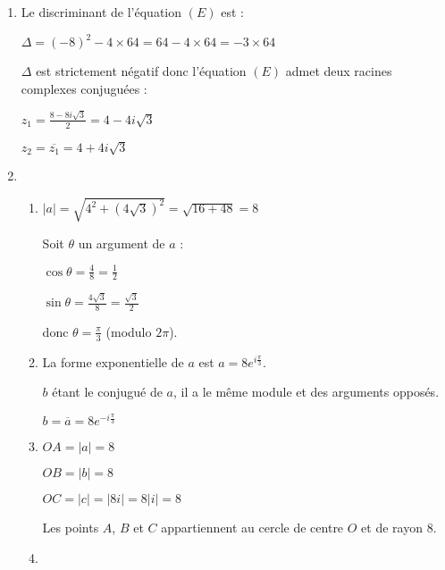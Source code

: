 \begin{corrige}
     \begin{enumerate}
          \item
          Le discriminant de l'équation $(E)$ est :
          \par
          $\Delta = (-8)^2-4 \times 64 = 64-4 \times 64=-3 \times 64$
          \par
          $\Delta$ est strictement négatif donc l'équation $(E)$ admet deux racines complexes conjuguées :
          \par
          $z_1=\frac{8-8i\sqrt{3}}{2}=4-4i\sqrt{3}$
          \par
          $z_2=\overline{z_1}=4+4i\sqrt{3}$
          \item
          \begin{enumerate}[label=\alph*.] 
               \item
               $|a|=\sqrt{4^2+(4\sqrt{3})^2}=\sqrt{16+48}=8$
               \par
               Soit $\theta$ un argument de $a$ :
               \par
               $\cos \theta=\frac{4}{8}=\frac{1}{2}$
               \par
               $\sin \theta=\frac{4\sqrt{3}}{8}=\frac{\sqrt{3}}{2}$
               \par
               donc $\theta = \frac{\pi}{3}$ (modulo $2\pi$).
               \item
               La forme exponentielle de $a$ est $a=8 e^{i \frac{\pi}{3}}$.
               \par
               $b$ étant le conjugué de $a$, il a le même module et des arguments opposés.
               \par
               $b=\overline{a}=8 e^{-i \frac{\pi}{3}}$
               \item
               $OA=|a|=8$
               \par
               $OB=|b|=8$
               \par
               $OC=|c|=|8i|=8|i|=8$
               \par
               Les points $A$, $B$ et $C$ appartiennent au cercle de centre $O$ et de rayon $8$.
               \item


\end{enumerate}
\end{enumerate}
\end{corrige}
